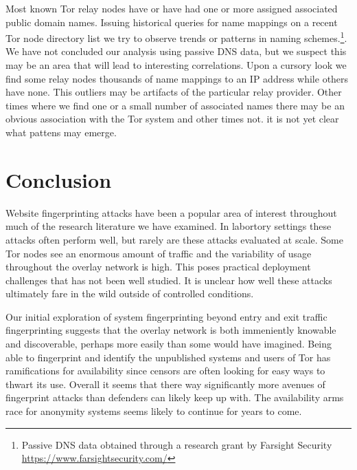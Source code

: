 \documentclass[sigconf]{acmart}
\begin{document}
Most known Tor relay nodes have or have had one or more assigned
associated public domain names.  Issuing historical queries for name
mappings on a recent Tor node directory list we try to observe trends or
patterns in naming schemes.\footnote{Passive DNS data obtained through a
research grant by Farsight Security
\url{https://www.farsightsecurity.com/}}.  We have not concluded our
analysis using passive DNS data, but we suspect this may be an area that
will lead to interesting correlations.  Upon a cursory look we find some
relay nodes thousands of name mappings to an IP address while others
have none.  This outliers may be artifacts of the particular relay
provider.  Other times where we find one or a small number of associated
names there may be an obvious association with the Tor system and other
times not.  it is not yet clear what pattens may emerge.

\section{Conclusion}

Website fingerprinting attacks have been a popular area of interest
throughout much of the research literature we have examined.
In labortory settings these attacks often perform well, but rarely are
these attacks evaluated at scale.  Some Tor nodes see an enormous amount
of traffic and the variability of usage throughout the overlay network
is high.  This poses practical deployment challenges that has not been
well studied.  It is unclear how well these attacks ultimately fare in
the wild outside of controlled conditions.

Our initial exploration of system fingerprinting beyond entry and exit
traffic fingerprinting suggests that the overlay network is both
immeniently knowable and discoverable, perhaps more easily than some
would have imagined.  Being able to fingerprint and identify the
unpublished systems and users of Tor has ramifications for availability
since censors are often looking for easy ways to thwart its use.
Overall it seems that there way significantly more avenues of
fingerprint attacks than defenders can likely keep up with.  The
availability arms race for anonymity systems seems likely to continue
for years to come.


\end{document}
